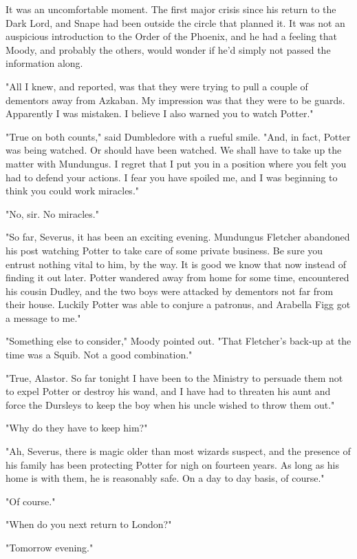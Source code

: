\documentclass[a4paper,11pt]{article}
\begin{document}
It was an uncomfortable moment. The first major crisis since his return to the Dark Lord, and Snape had been outside the circle that planned it. It was not an auspicious introduction to the Order of the Phoenix, and he had a feeling that Moody, and probably the others, would wonder if he'd simply not passed the information along.

"All I knew, and reported, was that they were trying to pull a couple of dementors away from Azkaban. My impression was that they were to be guards. Apparently I was mistaken. I believe I also warned you to watch Potter."

"True on both counts," said Dumbledore with a rueful smile. "And, in fact, Potter was being watched. Or should have been watched. We shall have to take up the matter with Mundungus. I regret that I put you in a position where you felt you had to defend your actions. I fear you have spoiled me, and I was beginning to think you could work miracles."

"No, sir. No miracles."

"So far, Severus, it has been an exciting evening. Mundungus Fletcher abandoned his post watching Potter to take care of some private business. Be sure you entrust nothing vital to him, by the way. It is good we know that now instead of finding it out later. Potter wandered away from home for some time, encountered his cousin Dudley, and the two boys were attacked by dementors not far from their house. Luckily Potter was able to conjure a patronus, and Arabella Figg got a message to me."

"Something else to consider," Moody pointed out. "That Fletcher's back-up at the time was a Squib. Not a good combination."

"True, Alastor. So far tonight I have been to the Ministry to persuade them not to expel Potter or destroy his wand, and I have had to threaten his aunt and force the Dursleys to keep the boy when his uncle wished to throw them out."

"Why do they have to keep him?"

"Ah, Severus, there is magic older than most wizards suspect, and the presence of his family has been protecting Potter for nigh on fourteen years. As long as his home is with them, he is reasonably safe. On a day to day basis, of course."

"Of course."

"When do you next return to London?"

"Tomorrow evening."
\end{document}
